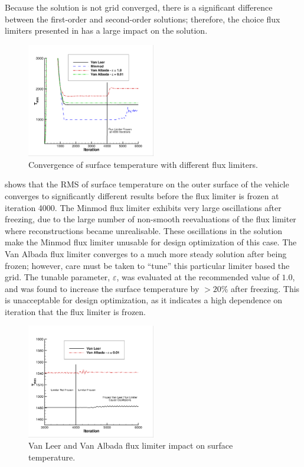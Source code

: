 Because the solution is not grid converged, there is a significant difference
between the first-order and second-order solutions; therefore, the choice flux
limiters presented in  has a large impact on
the solution.  
\begin{figure}[h]
  \centering
  \includegraphics[width=0.5\textwidth]{figures/limiters/all-limiters.png}
  \caption{Convergence of surface temperature with different flux limiters.}
  \label{fig:all-limiters}
\end{figure}
 shows that the RMS of surface temperature on the outer
surface of the vehicle converges to significantly different results before
the flux limiter is frozen at iteration 4000.  The Minmod flux limiter exhibits
very large oscillations after freezing, due to the large number of non-smooth
reevaluations of the flux limiter where reconstructions became unrealisable.
These oscillations in the solution make the Minmod flux limiter unusable for
design optimization of this case. The Van Albada flux limiter converges to a
much more steady solution after being frozen; however, care must be taken to
``tune'' this particular limiter based the grid.  The tunable parameter,
$\varepsilon$, was evaluated at the recommended value of $1.0$, and was found to
increase the surface temperature by $> 20\%$ after freezing.  This is
unacceptable for design optimization, as it indicates a high dependence on
iteration that the flux limiter is frozen.
\begin{figure}[h]
  \centering
  \includegraphics[width=0.5\textwidth]{figures/limiters/vanleer-vanalbada-frozen.png}
  \caption{Van Leer and Van Albada flux limiter impact on surface temperature.}
  \label{fig:vl-va-impact}
\end{figure}
